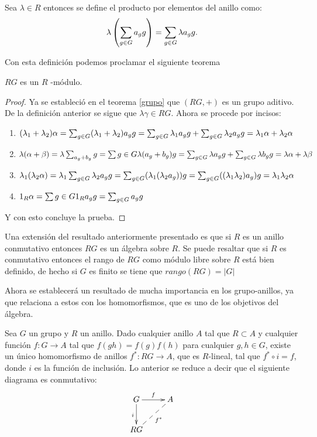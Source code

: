\begin{definicion}
Sea $\lambda \in R$ entonces se define el producto por elementos del anillo como: 
\begin{equation}
\lambda \left(\sum_{g \in G} a_{g} g\right) = \sum_{g \in G} \lambda a_{g} g.
\end{equation}
\end{definicion}
Con esta definición podemos proclamar el siguiente teorema
\begin{teorema}
$RG$ es un $R$ -módulo.
\end{teorema}
\begin{proof}
Ya se estableció en el teorema \ref{grupo} que $(RG,+)$ es un grupo aditivo. De la definición anterior se sigue que $\lambda\gamma \in RG$. Ahora se procede por incisos: 
\begin{enumerate}
\item $(\lambda_1+\lambda_2)\alpha = \sum_{g \in G} (\lambda_1+\lambda_2)a_gg = \sum_{g \in G} \lambda_1 a_{g} g + \sum_{g \in G} \lambda_2 a_{g} g = \lambda_1\alpha + \lambda_2\alpha$
\item $\lambda(\alpha + \beta) = \lambda\sum_{a_g+b_g}g = \sum{g \in G}\lambda(a_g+b_g)g = \sum_{g \in G} \lambda a_{g} g + \sum_{g \in G} \lambda b_{g} g = \lambda\alpha + \lambda\beta$
\item  $\lambda_1(\lambda_2\alpha) = \lambda_1\sum_{g \in G} \lambda_2 a_{g} g = \sum_{g\in G}(\lambda_1(\lambda_2 a_g))g = \sum_{g\in G}((\lambda_1\lambda_2)a_g)g = \lambda_1\lambda_2\alpha$
\item $1_R\alpha = \sum{g \in G}1_Ra_gg = \sum_{g \in G} a_{g} g$
\end{enumerate}
Y con esto concluye la prueba. \qedhere
\end{proof}
Una extensión del resultado anteriormente presentado es que si $R$ es un anillo conmutativo entonces $RG$ es un álgebra sobre $R$. Se puede resaltar que si $R$ es conmutativo  entonces el rango de $RG$ como módulo libre sobre $R$ está bien definido, de hecho si $G$ es finito se tiene que $rango(RG) = |G|$

Ahora se establecerá un resultado de mucha importancia en los grupo-anillos, ya que relaciona a estos con los homomorfismos, que es uno de los objetivos del álgebra.

\begin{proposicion}\label{up}
Sea $G$ un grupo y $R$ un anillo. Dado cualquier anillo $A$ tal que $R \subset A$ y cualquier función $f \colon G \to A$ tal que $f(gh) = f(g)f(h)$ para cualquier $g,h \in G$, existe un único homomorfismo de anillos $f^* \colon  RG \to A$, que es $R$-lineal, tal que $f^*\circ i = f$, donde $i$ es la función de inclusión. Lo anterior se reduce a decir que el siguiente diagrama es conmutativo:
\[\xymatrix { G \ar[r]^f 
\ar[d]_i & A\\
RG \ar@{--}[ru]_{f^*} & }\]
\end{proposicion}

